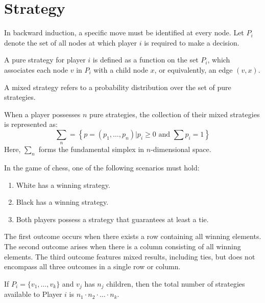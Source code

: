 \section{Strategy}

In backward induction, a specific move must be identified at every node. 
Let $P_i$ denote the set of all nodes at which player $i$ is required to make a decision.
\begin{definition}
    A pure strategy for player $i$ is defined as a function on the set $P_i$, which associates each node $v$ in $P_i$ with a child node $x$, or equivalently, an edge $(v, x)$.
\end{definition}
\begin{definition}
    A mixed strategy refers to a probability distribution over the set of pure strategies.
\end{definition}
When a player possesses $n$ pure strategies, the collection of their mixed strategies is represented as:
\[\sum_n=\left\{p=(p_1,\dots,p_n)|p_i\geq 0 \text{ and }\sum{p_i}=1\right\}\]
Here, $\sum_n$ forms the fundamental simplex in $n$-dimensional space. 

\begin{theorem}
    In the game of chess, one of the following scenarios must hold: 
    \begin{enumerate}
        \item White has a winning strategy.
        \item Black has a winning strategy.
        \item Both players possess a strategy that guarantees at least a tie.
    \end{enumerate}
\end{theorem}
\noindent The first outcome occurs when there exists a row containing all winning elements. 
The second outcome arises when there is a column consisting of all winning elements. 
The third outcome features mixed results, including ties, but does not encompass all three outcomes in a single row or column.

If $P_i = \{v_1, \dots, v_k \}$ and $v_j$ has $n_j$ children, then the total number of strategies available to Player $i$ is $n_1 \cdot n_2 \cdot \dots \cdot n_k$. 